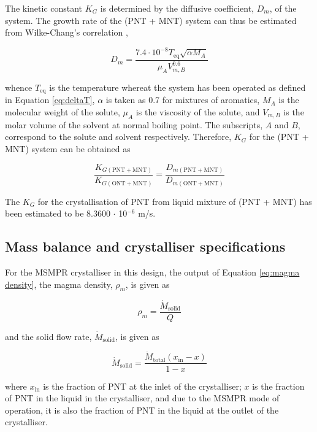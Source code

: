 The kinetic constant $K_G$ is determined by the diffusive coefficient, $D_m$, of the system. The growth rate of the (PNT + MNT) system can thus be estimated from Wilke-Chang's correlation \cite{miyabe_estimation_2011},

\begin{equation}
    D_m = \frac{7.4 \cdot 10^{-8} T_{\mathrm{eq}} \sqrt{\alpha M_A}}{\mu_A V_{m,B}^0.6}
\end{equation}

\noindent whence $T_{\mathrm{eq}}$ is the temperature whereat the system has been operated as defined in Equation \ref{eq:deltaT}, $\alpha$ is taken as 0.7 for mixtures of aromatics, $M_A$ is the molecular weight of the solute, $\mu_A$ is the viscosity of the solute, and $V_{m,B}$ is the molar volume of the solvent at normal boiling point. The subscripts, $A$ and $B$, correspond to the solute and solvent respectively. Therefore, $K_G$ for the (PNT + MNT) system can be obtained as 

\begin{equation} \label{eq:ratio of growth kinetics}
    \frac{K_{G\mathrm{(PNT + MNT)}}}{K_{G\mathrm{(ONT + MNT)}}} = \frac{D_{m\mathrm{(PNT + MNT)}}}{D_{m\mathrm{(ONT + MNT)}}}
\end{equation}

\noindent The $K_G$ for the crystallisation of PNT from liquid mixture of (PNT + MNT) has been estimated to be 8.3600 $\cdot$ 10$^{-6}$ m/s. 

\subsection{Mass balance and crystalliser specifications} \label{sec: crystalliser mass balance}

For the MSMPR crystalliser in this design, the output of Equation \ref{eq:magma density}, the magma density, $\rho_m$, is given as 

\begin{equation}
    \rho_m = \frac{\dot{M}_{\mathrm{solid}}}{Q}
\end{equation}

\noindent and the solid flow rate, $\dot{M}_{\mathrm{solid}}$, is given as

\begin{equation}
    \dot{M}_{\mathrm{solid}} = \frac{\dot{M}_{\mathrm{total}} (x_{\mathrm{in}} - x)}{1 - x}
\end{equation}

\noindent where $x_{\mathrm{in}}$ is the fraction of PNT at the inlet of the crystalliser; $x$ is the fraction of PNT in the liquid in the crystalliser, and due to the MSMPR mode of operation, it is also the fraction of PNT in the liquid at the outlet of the crystalliser.

